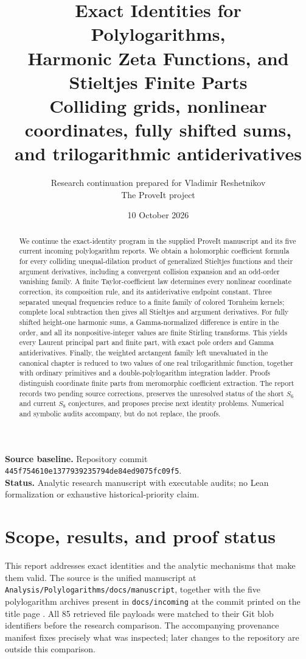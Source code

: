 \documentclass[11pt,a4paper]{article}
\title{\vspace{-7mm}\textbf{Exact Identities for Polylogarithms,\\
Harmonic Zeta Functions, and\\Stieltjes Finite Parts}\\[4mm]
\large Colliding grids, nonlinear coordinates, fully shifted sums,\\
and trilogarithmic antiderivatives}
\author{Research continuation prepared for Vladimir Reshetnikov\\
\small The ProveIt project}
\date{10 October 2026}
\numberwithin{equation}{section}
\theoremstyle{definition}
\theoremstyle{remark}
\begin{document}
\maketitle
\thispagestyle{empty}
\begin{abstract}
We continue the exact-identity program in the supplied ProveIt manuscript
and its five current incoming polylogarithm reports. We obtain a
holomorphic coefficient formula for every colliding unequal-dilation
product of generalized Stieltjes functions and their argument derivatives,
including a convergent collision expansion and an odd-order vanishing
family. A finite Taylor-coefficient law determines every nonlinear
coordinate correction, its composition rule, and its antiderivative
endpoint constant. Three separated unequal frequencies reduce to a finite
family of colored Tornheim kernels; complete local subtraction then gives
all Stieltjes and argument derivatives. For fully shifted height-one
harmonic sums, a Gamma-normalized difference is entire in the order, and
all its nonpositive-integer values are finite Stirling transforms. This
yields every Laurent principal part and finite part, with exact pole
orders and Gamma antiderivatives. Finally, the weighted arctangent family
left unevaluated in the canonical chapter is reduced to two values of one
real trilogarithmic function, together with ordinary primitives and a
double-polylogarithm integration ladder. Proofs distinguish coordinate
finite parts from meromorphic coefficient extraction. The report records
two pending source corrections, preserves the unresolved status of the
short $S_6$ and current $S_8$ conjectures, and proposes precise next
identity problems. Numerical and symbolic audits accompany, but do not
replace, the proofs.
\end{abstract}
\vfill
\noindent\textbf{Source baseline.} Repository commit
\texttt{445f754610e1377939235794de84ed9075fc09f5}.\\
\textbf{Status.} Analytic research manuscript with executable audits;
no Lean formalization or exhaustive historical-priority claim.
\clearpage
\begingroup
\small
\setlength{\parskip}{0pt}
\tableofcontents
\endgroup
\clearpage

\section{Scope, results, and proof status}
\label{xid:sec:introduction}

This report addresses exact identities and the analytic mechanisms that
make them valid. The source is the unified manuscript at
\texttt{Analysis/Polylogarithms/docs/manuscript}, together with the five
polylogarithm archives present in \texttt{docs/incoming} at the commit
printed on the title page \cite{ProveIt,IncomingGauss,IncomingMellin,
IncomingNested,IncomingContinuation,IncomingIdentities}. All 85 retrieved
file payloads were matched to their Git blob identifiers before the
research comparison. The accompanying provenance manifest fixes precisely
what was inspected; later changes to the repository are outside this
comparison.
\end{document}
